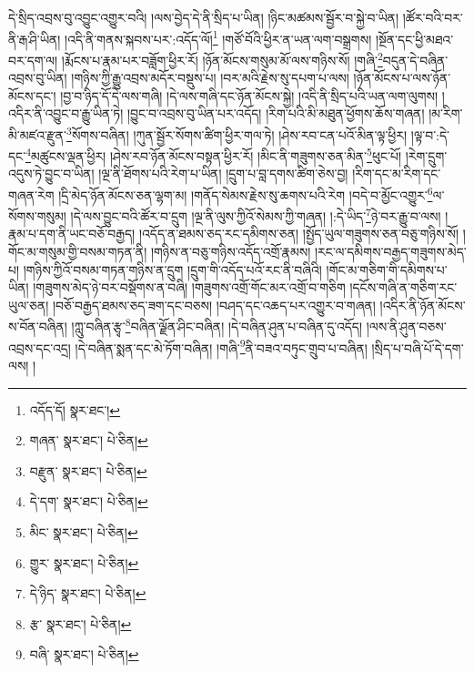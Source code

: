 དེ་སྲིད་འབྲས་བུ་འབྱུང་འགྱུར་བའི། །ལས་བྱེད་དེ་ནི་སྲིད་པ་ཡིན། །ཉིང་མཚམས་སྦྱོར་བ་སྐྱེ་བ་ཡིན། །ཚོར་བའི་བར་ནི་རྒ་ཤི་ཡིན། །འདི་ནི་གནས་སྐབས་པར་:འདོད་ལོ།\footnote{འདོད་དོ།  སྣར་ཐང་། } །གཙོ་བོའི་ཕྱིར་ན་ཡན་ལག་བསྒྲགས། །སྔོན་དང་ཕྱི་མཐའ་བར་དག་ལ། །རྨོངས་པ་རྣམ་པར་བཟློག་ཕྱིར་རོ། །ཉོན་མོངས་གསུམ་མོ་ལས་གཉིས་སོ། །གཞི་\footnote{གཞན་  སྣར་ཐང་།  པེ་ཅིན། }བདུན་དེ་བཞིན་འབྲས་བུ་ཡིན། །གཉིས་ཀྱི་རྒྱུ་འབྲས་མདོར་བསྡུས་པ། །བར་མའི་རྗེས་སུ་དཔག་པ་ལས། །ཉོན་མོངས་པ་ལས་ཉོན་མོངས་དང་། །བྱ་བ་ཉིད་དོ་དེ་ལས་གཞི། །དེ་ལས་གཞི་དང་ཉོན་མོངས་སྐྱེ། །འདི་ནི་སྲིད་པའི་ཡན་ལག་ལུགས། །འདིར་ནི་འབྱུང་བ་རྒྱུ་ཡིན་ཏེ། །བྱུང་བ་འབྲས་བུ་ཡིན་པར་འདོད། །རིག་པའི་མི་མཐུན་ཕྱོགས་ཆོས་གཞན། །མ་རིག་མི་མཛའ་རྫུན་\footnote{བརྫུན་  སྣར་ཐང་།  པེ་ཅིན། }སོགས་བཞིན། །ཀུན་སྦྱོར་སོགས་ཚིག་ཕྱིར་གལ་ཏེ། །ཤེས་རབ་ངན་པའོ་མིན་ལྟ་ཕྱིར། །ལྟ་བ་:དེ་དང་\footnote{དེ་དག་  སྣར་ཐང་།  པེ་ཅིན། }མཚུངས་ལྡན་ཕྱིར། །ཤེས་རབ་ཉོན་མོངས་བསྟན་ཕྱིར་རོ། །མིང་ནི་གཟུགས་ཅན་མིན་\footnote{མིང་  སྣར་ཐང་།  པེ་ཅིན། }ཕུང་པོ། །རེག་དྲུག་འདུས་ཏེ་བྱུང་བ་ཡིན། །ལྔ་ནི་ཐོགས་པའི་རེག་པ་ཡིན། །དྲུག་པ་བླ་དགས་ཚིག་ཅེས་བྱ། །རིག་དང་མ་རིག་དང་གཞན་རེག །དྲི་མེད་ཉོན་མོངས་ཅན་ལྷག་མ། །གནོད་སེམས་རྗེས་སུ་ཆགས་པའི་རེག །བདེ་བ་མྱོང་འགྱུར་\footnote{གྱུར་  སྣར་ཐང་།  པེ་ཅིན། }ལ་སོགས་གསུམ། །དེ་ལས་བྱུང་བའི་ཚོར་བ་དྲུག །ལྔ་ནི་ལུས་ཀྱིའོ་སེམས་ཀྱི་གཞན། །:དེ་ཡིད་\footnote{དེ་ཉིད་  སྣར་ཐང་།  པེ་ཅིན། }ཉེ་བར་རྒྱུ་བ་ལས། །རྣམ་པ་དག་ནི་ཡང་བཅོ་བརྒྱད། །འདོད་ན་ཐམས་ཅད་རང་དམིགས་ཅན། །སྤྱོད་ཡུལ་གཟུགས་ཅན་བཅུ་གཉིས་སོ། །གོང་མ་གསུམ་གྱི་བསམ་གཏན་ནི། །གཉིས་ན་བཅུ་གཉིས་འདོད་འགྲོ་རྣམས། །རང་ལ་དམིགས་བརྒྱད་གཟུགས་མེད་པ། །གཉིས་ཀྱིའོ་བསམ་གཏན་གཉིས་ན་དྲུག །དྲུག་གི་འདོད་པའོ་རང་ནི་བཞིའི། །གོང་མ་གཅིག་གི་དམིགས་པ་ཡིན། །གཟུགས་མེད་ཉེ་བར་བསྡོགས་ན་བཞི། །གཟུགས་འགྲོ་གོང་མར་འགྲོ་བ་གཅིག །དངོས་གཞི་ན་གཅིག་རང་ཡུལ་ཅན། །བཅོ་བརྒྱད་ཐམས་ཅད་ཟག་དང་བཅས། །བཤད་དང་འཆད་པར་འགྱུར་བ་གཞན། །འདིར་ནི་ཉོན་མོངས་ས་བོན་བཞིན། །ཀླུ་བཞིན་རྩྭ་\footnote{རྩ་  སྣར་ཐང་།  པེ་ཅིན། }བཞིན་ལྗོན་ཤིང་བཞིན། །དེ་བཞིན་ཤུན་པ་བཞིན་དུ་འདོད། །ལས་ནི་ཤུན་བཅས་འབྲས་དང་འདྲ། །དེ་བཞིན་སྨན་དང་མེ་ཏོག་བཞིན། །གཞི་\footnote{བཞི་  སྣར་ཐང་།  པེ་ཅིན། }ནི་བཟའ་བཏུང་གྲུབ་པ་བཞིན། །སྲིད་པ་བཞི་པོ་དེ་དག་ལས། །
